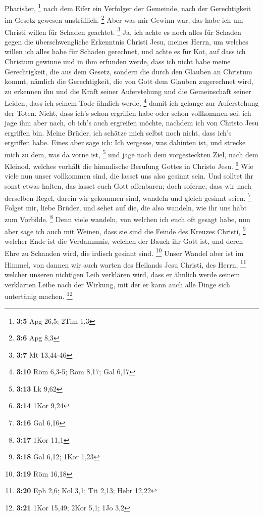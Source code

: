 Pharisäer, \footnote{\textbf{3:5} Apg 26,5; 2Tim 1,3} 
nach dem Eifer ein Verfolger der Gemeinde, nach der Gerechtigkeit im
Gesetz gewesen unsträflich. \footnote{\textbf{3:6} Apg 8,3}
 Aber was mir Gewinn war, das habe ich um Christi willen
für Schaden geachtet. \footnote{\textbf{3:7} Mt 13,44-46} 
Ja, ich achte es noch alles für Schaden gegen die überschwengliche
Erkenntnis Christi Jesu, meines Herrn, um welches willen ich alles habe
für Schaden gerechnet, und achte es für Kot, auf dass ich Christum
gewinne  und in ihm erfunden werde, dass ich nicht habe
meine Gerechtigkeit, die aus dem Gesetz, sondern die durch den Glauben
an Christum kommt, nämlich die Gerechtigkeit, die von Gott dem Glauben
zugerechnet wird,  zu erkennen ihn und die Kraft seiner
Auferstehung und die Gemeinschaft seiner Leiden, dass ich seinem Tode
ähnlich werde, \footnote{\textbf{3:10} Röm 6,3-5; Röm 8,17; Gal 6,17}
 damit ich gelange zur Auferstehung der Toten.
 Nicht, dass ich's schon ergriffen habe oder schon
vollkommen sei; ich jage ihm aber nach, ob ich's auch ergreifen möchte,
nachdem ich von Christo Jesu ergriffen bin.  Meine
Brüder, ich schätze mich selbst noch nicht, dass ich's ergriffen habe.
Eines aber sage ich: Ich vergesse, was dahinten ist, und strecke mich zu
dem, was da vorne ist, \footnote{\textbf{3:13} Lk 9,62} 
und jage nach dem vorgesteckten Ziel, nach dem Kleinod, welches vorhält
die himmlische Berufung Gottes in Christo Jesu. \footnote{\textbf{3:14}
  1Kor 9,24}  Wie viele nun unser vollkommen sind, die
lasset uns also gesinnt sein. Und solltet ihr sonst etwas halten, das
lasset euch Gott offenbaren;  doch soferne, dass wir nach
derselben Regel, darein wir gekommen sind, wandeln und gleich gesinnt
seien. \footnote{\textbf{3:16} Gal 6,16}  Folget mir,
liebe Brüder, und sehet auf die, die also wandeln, wie ihr uns habt zum
Vorbilde. \footnote{\textbf{3:17} 1Kor 11,1}  Denn viele
wandeln, von welchen ich euch oft gesagt habe, nun aber sage ich auch
mit Weinen, dass sie sind die Feinde des Kreuzes Christi, \footnote{\textbf{3:18}
  Gal 6,12; 1Kor 1,23}  welcher Ende ist die Verdammnis,
welchen der Bauch ihr Gott ist, und deren Ehre zu Schanden wird, die
irdisch gesinnt sind. \footnote{\textbf{3:19} Röm 16,18} 
Unser Wandel aber ist im Himmel, von dannen wir auch warten des Heilands
Jesu Christi, des Herrn, \footnote{\textbf{3:20} Eph 2,6; Kol 3,1; Tit
  2,13; Hebr 12,22}  welcher unseren nichtigen Leib
verklären wird, dass er ähnlich werde seinem verklärten Leibe nach der
Wirkung, mit der er kann auch alle Dinge sich untertänig machen.
\footnote{\textbf{3:21} 1Kor 15,49; 2Kor 5,1; 1Jo 3,2}

